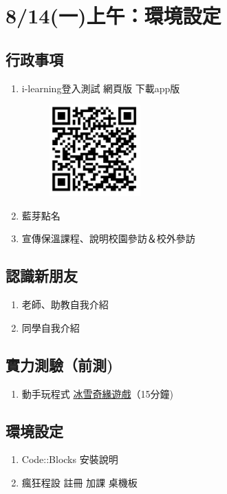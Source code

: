 
\section{8/14(一)上午：環境設定}

\subsection{行政事項}
\begin{enumerate}
	\item i-learning登入測試
		\subitem 網頁版
		\subitem 下載app版
		\begin{figure}[H]
			\centering
			\includegraphics[width=3.5cm]{fig/QRcode}
		\end{figure}
	\item 藍芽點名
	\item 宣傳保溫課程、說明校園參訪＆校外參訪

\end{enumerate}
\subsection{認識新朋友}
\begin{enumerate}
	\item 老師、助教自我介紹
	\item 同學自我介紹
\end{enumerate}
	

\subsection{實力測驗（前測)}
\begin{enumerate}

\item 動手玩程式
\subitem \href{https://studio.code.org/courses}{冰雪奇緣遊戲}（15分鐘)
\end{enumerate}

\subsection{環境設定}
\begin{enumerate}
\item Code::Blocks
\subitem 安裝說明
\item 瘋狂程設
\subitem 註冊
\subitem 加課
\subitem 桌機板	
\end{enumerate}

